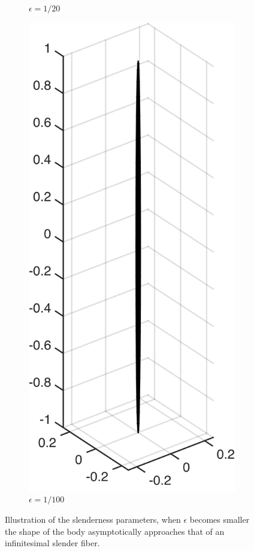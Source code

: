 \begin{figure}[!htbp]
\begin{subfigure}[h]{0.24\textwidth}
    \caption{$\epsilon=1/20$}\label{fig:slenderness_1_20}
  \end{subfigure}
  \begin{subfigure}[h]{0.24\textwidth}
    \centering
    \includegraphics[width=\textwidth]{img/slender/1_100.png}
    \caption{$\epsilon=1/100$}\label{fig:slenderness_1_100}
  \end{subfigure}
  \caption[Illustration of the slenderness parameters.]{Illustration of the slenderness parameters, when $\epsilon$ becomes smaller the shape of the body asymptotically approaches that of an infinitesimal slender fiber.}
  \label{fig:slenderness}
\end{figure}

